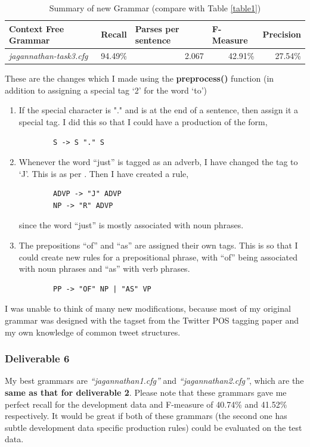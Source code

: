 \documentclass[10pt, letter]{article}
\begin{document}
\begin{table}[htbp]
\centering
\begin{tabular}{|l|r|r|r|r|}
\hline
Context Free Grammar & \multicolumn{1}{l|}{Recall} & \multicolumn{1}{l|}{Parses per sentence} & \multicolumn{1}{l|}{F-Measure} & \multicolumn{1}{l|}{Precision} \\ \hline
\textit{jagannathan-task3.cfg} & 94.49\% & 2.067 & 42.91\% & 27.54\% \\ \hline
\end{tabular}
\caption{Summary of new Grammar (compare with Table \ref{table1})}
\label{table3}
\end{table}

These are the changes which I made using the \textbf{preprocess()} function (in addition to assigning a special tag `2' for the word `to')
\begin{enumerate}
	\item If the special character is "." and is at the end of a sentence, then assign it a special tag. I did this so that I could have a production of the form,
	\begin{verbatim}
		S -> S "." S
	\end{verbatim}
	\item Whenever the word ``just'' is tagged as an adverb, I have changed the tag to `J'. This is as per \cite{klein2003accurate}. Then I have created a rule,
	\begin{verbatim}
		ADVP -> "J" ADVP
		NP -> "R" ADVP
	\end{verbatim}
	since the word ``just'' is mostly associated with noun phrases.
	\item The prepositions ``of'' and ``as'' are assigned their own tags. This is so that I could create new rules for a prepositional phrase, with ``of'' being associated with noun phrases and ``as'' with verb phrases.
	\begin{verbatim}
		PP -> "OF" NP | "AS" VP
	\end{verbatim}
\end{enumerate}
I was unable to think of many new modifications, because most of my original grammar was designed with the tagset from the Twitter POS tagging paper \cite{gimpel2010part} and my own knowledge of common tweet structures.

\subsubsection*{Deliverable 6}

My best grammars are \textit{``jagannathan1.cfg''} and \textit{``jagannathan2.cfg''}, which are the \textbf{same as that for deliverable 2}. Please note that these grammars gave me perfect recall for the development data and F-measure of 40.74\% and 41.52\% respectively. It would be great if both of these grammars (the second one has subtle development data specific production rules) could be evaluated on the test data.
\end{document}
